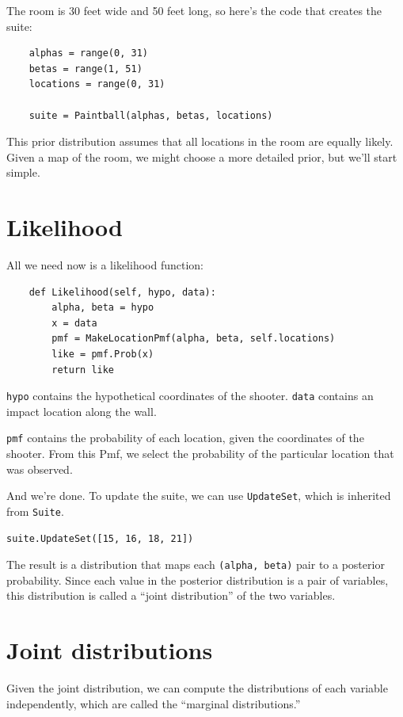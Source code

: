 \documentclass[12pt]{book}
\begin{document}
The room is 30 feet wide and 50 feet long, so here's the code that
creates the suite:

\begin{verbatim}
    alphas = range(0, 31)
    betas = range(1, 51)
    locations = range(0, 31)

    suite = Paintball(alphas, betas, locations)
\end{verbatim}

This prior distribution assumes that all locations in the room are
equally likely.  Given a map of the room, we might choose a more
detailed prior, but we'll start simple.


\section{Likelihood}

All we need now is a likelihood function:

\begin{verbatim}
    def Likelihood(self, hypo, data):
        alpha, beta = hypo
        x = data
        pmf = MakeLocationPmf(alpha, beta, self.locations)
        like = pmf.Prob(x)
        return like
\end{verbatim}

{\tt hypo} contains the hypothetical coordinates of the shooter.
{\tt data} contains an impact location along the wall.

{\tt pmf} contains the probability of each location, given the
coordinates of the shooter.  From this Pmf, we select the probability
of the particular location that was observed.

And we're done.  To update the suite, we can use {\tt UpdateSet},
which is inherited from {\tt Suite}.

\begin{verbatim}
suite.UpdateSet([15, 16, 18, 21])
\end{verbatim}

The result is a distribution that maps each {\tt (alpha, beta)} pair
to a posterior probability.  Since each value in the posterior
distribution is a pair of variables, this distribution is called a
``joint distribution'' of the two variables.


\section{Joint distributions}

Given the joint distribution, we can compute the distributions
of each variable independently, which are called the ``marginal
distributions.''
\end{document}
